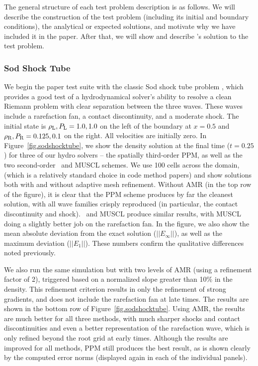 The general structure of each test problem description is as follows.
We will describe the construction of the test problem (including its
initial and boundary conditions), the analytical or expected
solutions, and motivate why we have included it in the paper.  After
that, we will show and describe \enzo's solution to the test problem.


\subsubsection{Sod Shock Tube}
\label{sec.tests.sodshock}

We begin the paper test suite with the classic Sod shock tube problem
\citep{Sod78}, which provides a good test of a hydrodynamical solver's
ability to resolve a clean Riemann problem with clear separation
between the three waves.  These waves include a rarefaction fan, a
contact discontinuity, and a moderate shock.  The initial state is 
$\rho_{\rm L}, P_{\rm L} = 1.0, 1.0$ on the left of the boundary at 
$x=0.5$ and $\rho_{\rm R}, P_{\rm R} = 0.125, 0.1$ on the right.
All velocities are initially zero.  In
Figure~\ref{fig.sodshocktube}, we show the density solution at the
final time ($t=0.25$) for three of our hydro solvers -- the spatially third-order
PPM, as well as the two second-order \zeus\ and MUSCL schemes.  We use
100 cells across the domain, (which is a relatively standard choice in
code method papers) and show solutions both with and without adaptive
mesh refinement.  Without AMR (in the top row of the figure), it is
clear that the PPM scheme produces by far the cleanest solution, with
all wave families crisply reproduced (in particular, the contact
discontinuity and shock).  \zeus\ and MUSCL produce similar results,
with MUSCL doing a slightly better job on the rarefaction fan.  In the
figure, we also show the mean absolute deviation from the exact
solution ($||E_\infty||$), as well as the maximum deviation
($||E_1||$).  These numbers confirm the qualitative differences noted
previously.

We also run the same simulation but with two levels of AMR (using a
refinement factor of 2), triggered based on a normalized slope greater
than 10\% in the density.  This refinement criterion results in only
the refinement of strong gradients, and
does not include the rarefaction fan at late times.  The results are
shown in the bottom row of Figure~\ref{fig.sodshocktube}.  Using AMR,
the results are much better for all three methods, with much sharper
shocks and contact discontinuities and even a better representation of
the rarefaction wave, which is only refined beyond the root grid at
early times.  Although the results are improved for all methods, PPM
still produces the best result, as is shown clearly by the computed
error norms (displayed again in each of the individual panels).

